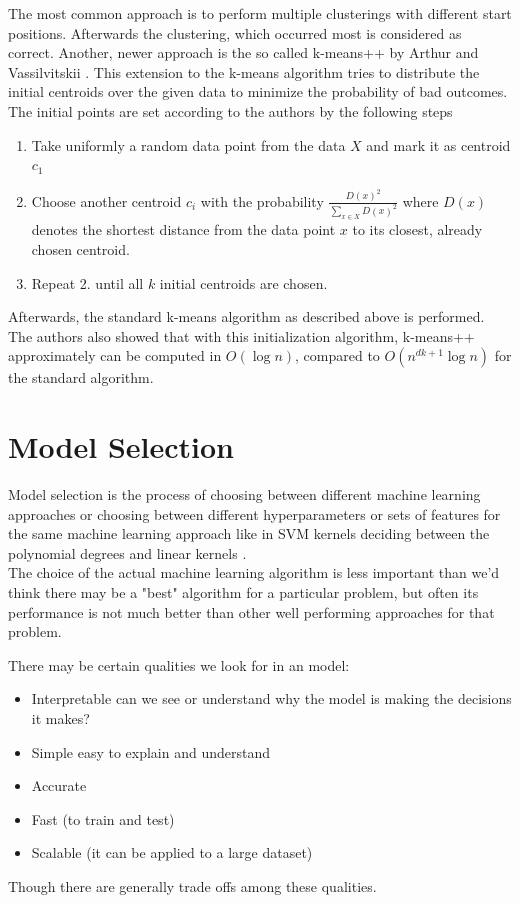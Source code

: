 The most common approach is to perform multiple clusterings with different start positions. Afterwards the clustering, which occurred most is considered as correct. Another, newer approach is the so called k-means++ by Arthur and Vassilvitskii \cite{Arthur}. This extension to the k-means algorithm tries to distribute the initial centroids over the given data to minimize the probability of bad outcomes. The initial points are set according to the authors by the following steps

\begin{enumerate}
    \item Take uniformly a random data point from the data $X$ and mark it as centroid $c_1$
    \item Choose another centroid $c_i$ with the probability $\frac{D(x)^2}{\sum_{x \in X} D(x)^2}$ where $D(x)$ denotes the shortest distance from the data point $x$ to its closest, already chosen centroid.
    \item Repeat 2. until all $k$ initial centroids are chosen.
\end{enumerate}
Afterwards, the standard k-means algorithm as described above is performed. The authors also showed that with this initialization algorithm, k-means++ approximately can be computed in $O(\log n)$, compared to $O(n^{dk+1} \log n)$ for the standard algorithm.



\section{Model Selection } \label{ms}
Model selection is the process of choosing between different machine learning approaches  or choosing between different hyperparameters or sets of features for the same machine learning approach  like in SVM kernels deciding between the polynomial degrees and  linear kernels .\\
The choice of the actual machine learning algorithm is less important than we'd think  there may be a "best" algorithm for a particular problem, but often its performance is not much better than other well performing approaches for that problem.

There may be certain qualities we look for in an model:

\begin{itemize}
\item Interpretable   can we see or understand why the model is making the decisions it makes?
\item Simple   easy to explain and understand
\item Accurate
\item Fast (to train and test)
\item Scalable (it can be applied to a large dataset)

\end{itemize}
Though there are generally trade offs among these qualities.

